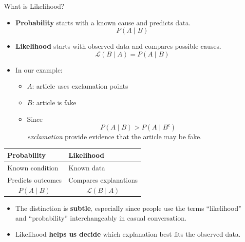 \documentclass[12pt]{beamer}
\begin{document}
\begin{frame}{}
\begin{block}{What is Likelihood?}
\begin{itemize}
    \item \textbf{Probability} starts with a known cause and predicts data.
    \[
    P(A \mid B)
    \]
    \item \textbf{Likelihood} starts with observed data and compares possible causes.
    \[
    \mathcal{L}(B \mid A)=P(A \mid B)
    \]
    \item In our example:
    \begin{itemize}
        \item \(A\): article uses exclamation points
        \item \(B\): article is fake
        \item Since
              \[
              P(A \mid B) > P(A \mid B^c)
              \]
              \emph{exclamation} provide evidence that the article may be fake.
        \end{itemize}
\end{itemize}
\end{block}
\end{frame}

\begin{frame}{}
\begin{center}
\begin{tabular}{p{4cm}|p{4cm}}
\textbf{Probability} & \textbf{Likelihood} \\
\hline
Known condition & Known data \\
Predicts outcomes & Compares explanations \\
\[
P(A \mid B)
\]
& 
\[
\mathcal{L}(B \mid A)
\]
\end{tabular}
\end{center}
\begin{itemize}
\item The distinction is \textbf{subtle}, especially since people use the terms “likelihood” and “probability” interchangeably in casual conversation.
\item Likelihood \textbf{helps us decide} which explanation best fits the observed data.
\end{itemize}
\end{frame}
\end{document}
